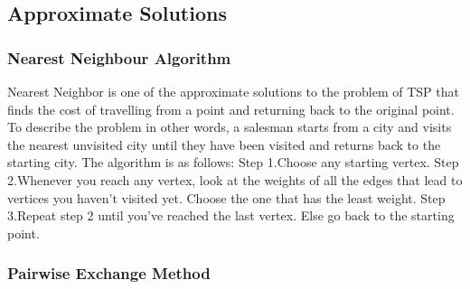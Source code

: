 \documentclass[11pt]{article}
\begin{document}
		
		
	\subsection{ Approximate Solutions}
		\subsubsection {Nearest Neighbour Algorithm}
		Nearest Neighbor is one of the approximate solutions to the problem of TSP that finds the cost of travelling from a point and returning back to the original point. To describe the problem in other words, a salesman starts from a city and visits the nearest unvisited city until they have been visited and returns back to the starting city. \newline \newline
		The algorithm is as follows: \newline
		Step 1.Choose any starting vertex. \newline
        Step 2.Whenever you reach any vertex, look at the weights of all the edges that lead to vertices you haven’t visited yet. Choose the one that has the least weight. \newline
        Step 3.Repeat step 2 until you’ve reached the last vertex. Else go back to the starting point.
    \subsubsection {Pairwise Exchange Method}
\end{document}
